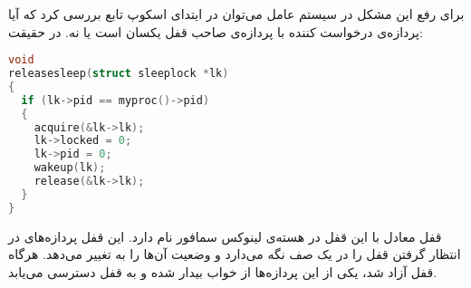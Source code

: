 برای رفع این مشکل در سیستم عامل
می‌توان در ایتدای اسکوپ تابع
بررسی کرد که آیا
پردازه‌ی درخواست کننده با
پردازه‌ی صاحب قفل یکسان است یا نه. در حقیقت:
\begin{latin}
\begin{lstlisting}[language=c]
void
releasesleep(struct sleeplock *lk)
{
  if (lk->pid == myproc()->pid)
  {
	acquire(&lk->lk);
	lk->locked = 0;
	lk->pid = 0;
	wakeup(lk);
	release(&lk->lk);
  }
}
\end{lstlisting}
\end{latin}

قفل معادل با این قفل در هسته‌ی لینوکس سمافور نام دارد. این قفل پردازه‌های در انتظار گرفتن قفل را در یک صف نگه می‌دارد و وضعیت آن‌ها را به
تغییر می‌دهد. هرگاه قفل آزاد شد، یکی از این پردازه‌ها از خواب بیدار شده و به قفل دسترسی می‌یابد.